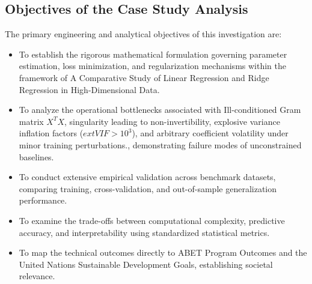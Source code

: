 \subsection{Objectives of the Case Study Analysis}
The primary engineering and analytical objectives of this investigation are:
\begin{itemize}
  \item To establish the rigorous mathematical formulation governing parameter estimation, loss minimization, and regularization mechanisms within the framework of A Comparative Study of Linear Regression and Ridge Regression in High-Dimensional Data.
  \item To analyze the operational bottlenecks associated with Ill-conditioned Gram matrix $X^T X$, singularity leading to non-invertibility, explosive variance inflation factors ($	ext{VIF} > 10^3$), and arbitrary coefficient volatility under minor training perturbations., demonstrating failure modes of unconstrained baselines.
  \item To conduct extensive empirical validation across benchmark datasets, comparing training, cross-validation, and out-of-sample generalization performance.
  \item To examine the trade-offs between computational complexity, predictive accuracy, and interpretability using standardized statistical metrics.
  \item To map the technical outcomes directly to ABET Program Outcomes and the United Nations Sustainable Development Goals, establishing societal relevance.
\end{itemize}
